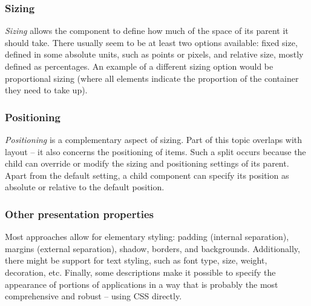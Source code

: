 \subsubsection{Sizing}
\emph{Sizing} allows the component to define how much of the space of its parent it should take.
There usually seem to be at least two options available: fixed size, defined in some absolute units, such as points or pixels, and relative size, mostly defined as percentages.
An example of a different sizing option would be proportional sizing (where all elements indicate the proportion of the container they need to take up).

\subsubsection{Positioning}
\emph{Positioning} is a complementary aspect of sizing.
Part of this topic overlaps with layout -- it also concerns the positioning of items.
Such a split occurs because the child can override or modify the sizing and positioning settings of its parent.
Apart from the default setting, a child component can specify its position as absolute or relative to the default position.

\subsubsection{Other presentation properties}
Most approaches allow for elementary styling: padding (internal separation), margins (external separation), shadow, borders, and backgrounds.
Additionally, there might be support for text styling, such as font type, size, weight, decoration, etc.
Finally, some descriptions make it possible to specify the appearance of portions of applications in a way that is probably the most comprehensive and robust -- using CSS directly.
